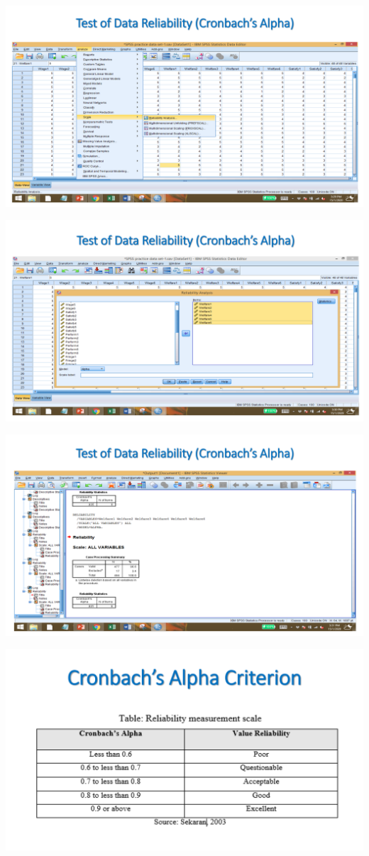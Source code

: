 \documentclass[
  letterpaper,
  DIV=11,
  numbers=noendperiod]{scrreprt}
\begin{document}
\includegraphics{images/slides/img_Page_062.png}

\includegraphics{images/slides/img_Page_063.png}

\includegraphics{images/slides/img_Page_064.png}

\includegraphics{images/slides/img_Page_065.png}
\end{document}
